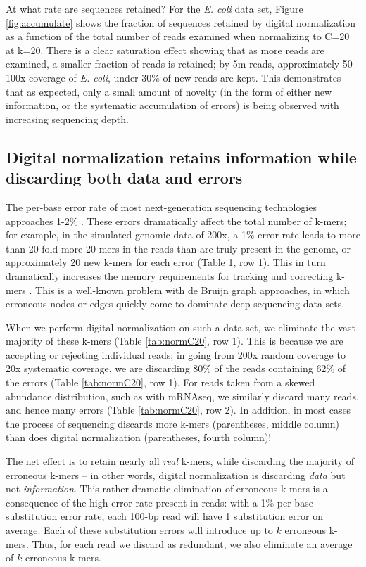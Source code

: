 \documentclass{pnastwo}
\begin{document}
\begin{article}
At what rate are sequences retained?  For the {\em E. coli} data set,
Figure \ref{fig:accumulate} shows the fraction of sequences retained
by digital normalization as a function of the total number of reads
examined when normalizing to C=20 at k=20.  There is a clear
saturation effect showing that as more reads are examined, a smaller
fraction of reads is retained; by 5m reads, approximately 50-100x
coverage of {\em E. coli}, under 30\% of new reads are kept.  This
demonstrates that as expected, only a small amount of novelty (in
the form of either new information, or the systematic accumulation of
errors) is being observed with increasing sequencing depth.


\subsection{Digital normalization retains information while discarding
both data and errors}

The per-base error rate of most next-generation sequencing
technologies approaches 1-2\% \cite{pubmed19997069}.  These errors
dramatically affect the total number of k-mers; for example, in the
simulated genomic data of 200x, a 1\% error rate leads to more than
20-fold more 20-mers in the reads than are truly present in the
genome, or approximately 20 new k-mers for each error (Table 1, row
1).  This in turn dramatically increases the memory requirements for
tracking and correcting k-mers \cite{pubmed21245053}.  This is a
well-known problem with de Bruijn graph approaches, in which erroneous
nodes or edges quickly come to dominate deep sequencing data sets.

When we perform digital normalization on such a data set, we eliminate
the vast majority of these k-mers (Table \ref{tab:normC20}, row 1).
This is because we are accepting or rejecting individual reads; in
going from 200x random coverage to 20x systematic coverage, we are
discarding 80\% of the reads containing 62\% of the errors (Table
\ref{tab:normC20}, row 1).  For reads taken from a skewed abundance
distribution, such as with mRNAseq, we similarly discard many reads,
and hence many errors (Table \ref{tab:normC20}, row 2).  In addition,
in most cases the process of sequencing discards more k-mers
(parentheses, middle column) than does digital normalization (parentheses,
fourth column)!

The net effect is to retain nearly all {\em real} k-mers, while
discarding the majority of erroneous k-mers -- in other words, digital
normalization is discarding {\em data} but not {\em information}.
This rather dramatic elimination of erroneous k-mers is a consequence
of the high error rate present in reads: with a 1\% per-base
substitution error rate, each 100-bp read will have 1 substitution
error on average. Each of these substitution errors will introduce up
to $k$ erroneous k-mers.  Thus, for each read we discard as redundant,
we also eliminate an average of $k$ erroneous k-mers.


\end{article}
\end{document}
